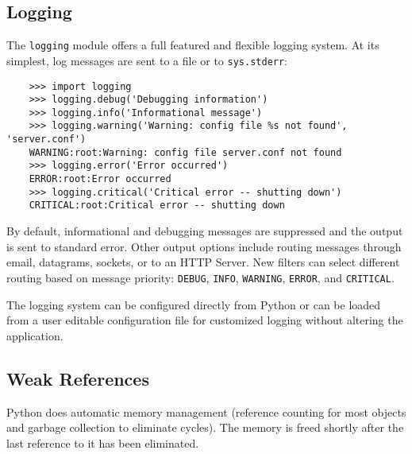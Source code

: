 \documentclass[UTF8]{article}
\begin{document}
\subsection{Logging}
The \texttt{logging} module offers a full featured and flexible logging system. At its simplest,
log messages are sent to a file or to \texttt{sys.stderr}:
\begin{verbatim}
    >>> import logging
    >>> logging.debug('Debugging information')
    >>> logging.info('Informational message')
    >>> logging.warning('Warning: config file %s not found', 'server.conf')
    WARNING:root:Warning: config file server.conf not found
    >>> logging.error('Error occurred')
    ERROR:root:Error occurred
    >>> logging.critical('Critical error -- shutting down')
    CRITICAL:root:Critical error -- shutting down
\end{verbatim}

By default, informational and debugging messages are suppressed and the output is sent to standard
error. Other output options include routing messages through email, datagrams, sockets, or to an
HTTP Server. New filters can select different routing based on message priority: \texttt{DEBUG},
\texttt{INFO}, \texttt{WARNING}, \texttt{ERROR}, and \texttt{CRITICAL}.

The logging system can be configured directly from Python or can be loaded from a user editable
configuration file for customized logging without altering the application.

\subsection{Weak References}
Python does automatic memory management (reference counting for most objects and garbage collection
to eliminate cycles). The memory is freed shortly after the last reference to it has been
eliminated.
\end{document}
